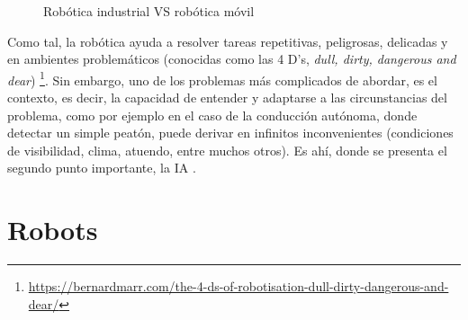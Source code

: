 \begin{figure} [tp]
	\centering
	\quad
	\quad
	\caption{Robótica industrial VS robótica móvil}
	\label{fig:industrial_vs_mobile}
\end{figure}

Como tal, la robótica ayuda a resolver tareas repetitivas, peligrosas, delicadas y en ambientes problemáticos (conocidas como las 4 D's, \emph{dull, dirty, dangerous and dear}) \footnote[5]{\url{https://bernardmarr.com/the-4-ds-of-robotisation-dull-dirty-dangerous-and-dear/}}. Sin embargo, uno de los problemas más complicados de abordar, es el contexto, es decir, la capacidad de entender y adaptarse a las circunstancias del problema, como por ejemplo en el caso de la conducción autónoma, donde detectar un simple peatón, puede derivar en infinitos inconvenientes (condiciones de visibilidad, clima, atuendo, entre muchos otros). Es ahí, donde se presenta el segundo punto importante, la \ac{IA} \cite{dworakowski2020robots}.\\

\section{Robots}
\label{sec:robots}

